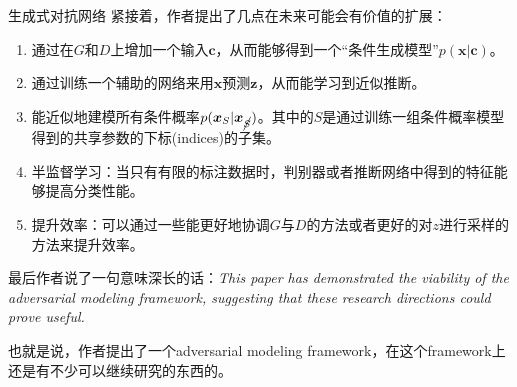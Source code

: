 \documentclass{ctexart}
\begin{document}
\begin{section}{生成式对抗网络}
		紧接着，作者提出了几点在未来可能会有价值的扩展：
		\begin{enumerate}
			\item 通过在$G$和$D$上增加一个输入$\boldsymbol{c}$，从而能够得到一个“条件生成模型”$p(\boldsymbol{x}|\boldsymbol{c})$。
			\item 通过训练一个辅助的网络来用$\boldsymbol{x}$预测$\boldsymbol{z}$，从而能学习到近似推断。
			\item 能近似地建模所有条件概率$p(\boldsymbol{x}_S|\boldsymbol{x}_{\cancel{S}})$。其中的$S$是通过训练一组条件概率模型得到的共享参数的下标(indices)的子集。
			\item 半监督学习：当只有有限的标注数据时，判别器或者推断网络中得到的特征能够提高分类性能。
			\item 提升效率：可以通过一些能更好地协调$G$与$D$的方法或者更好的对$z$进行采样的方法来提升效率。
		\end{enumerate}
	
		最后作者说了一句意味深长的话：\emph{This paper has demonstrated the viability of the adversarial modeling framework, suggesting that these research directions could prove useful.}
		
		也就是说，作者提出了一个adversarial modeling framework，在这个framework上还是有不少可以继续研究的东西的。
	\end{section}	
\end{document}
